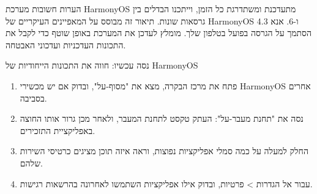 \begin{tcbwarn}{הערות חשובות}
מערכת HarmonyOS מתעדכנת ומשתדרגת כל הזמן, וייתכנו הבדלים בין גרסאות שונות. תיאור זה מבוסס על המאפיינים העיקריים של HarmonyOS 4.3 ו-6. אנא הסתמך על הגרסה בפועל בטלפון שלך. מומלץ לעדכן את המערכת באופן שוטף כדי לקבל את התכונות העדכניות ועדכוני האבטחה.

\end{tcbwarn}

\begin{tcbpractice}{נסה עכשיו: חווה את התכונות הייחודיות של HarmonyOS}
\begin{enumerate}
  \item פתח את מרכז הבקרה, מצא את "מסוף-על", ובדוק אם יש מכשירי HarmonyOS אחרים בסביבה.
  \item נסה את "תחנת מעבר-על": העתק טקסט לתחנת המעבר, ולאחר מכן גרור אותו החוצה באפליקציית התזכירים.
  \item החלק למעלה על כמה סמלי אפליקציות נפוצות, וראה איזה תוכן מציגים כרטיסי השירות שלהם.
  \item עבור אל הגדרות > פרטיות, ובדוק אילו אפליקציות השתמשו לאחרונה בהרשאות רגישות.
\end{enumerate}

\end{tcbpractice}
